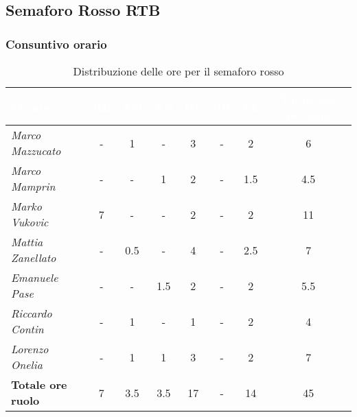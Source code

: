 \subsection{Semaforo Rosso RTB}
\subsubsection{Consuntivo orario}
\begin{table}[H]
    \renewcommand\arraystretch{1.5}
    \small
    \centering
        \begin{tabular}{|l|c|c|c|c|c|c|c|}
            \hline
            \rowcolor[HTML]{036400}
            \textcolor{white}{\textbf{Membro}} & \multicolumn{1}{c|}{\textcolor{white}{\textbf{RE}}} & \multicolumn{1}{c|}{\textcolor{white}{\textbf{AM}}} & \multicolumn{1}{c|}{\textcolor{white}{\textbf{AN}}} & \multicolumn{1}{c|}{\textcolor{white}{\textbf{PT}}} & \multicolumn{1}{c|}{\textcolor{white}{\textbf{PR}}} & \multicolumn{1}{c|}{\textcolor{white}{\textbf{VE}}} & \multicolumn{1}{c|}{\textcolor{white}{\textbf{Totale ore persona}}} \\ \hline
            \rowcolor[HTML]{EFEFEF}\textit{Marco Mazzucato}  & -        & 1          & -          & 3          & -        & 2        & 6       \\ \hline
            \rowcolor[HTML]{C0C0C0}\textit{Marco Mamprin}    & -        & -          & 1          & 2          & -        & 1.5      & 4.5       \\ \hline
            \rowcolor[HTML]{EFEFEF}\textit{Marko Vukovic}    & 7        & -          & -          & 2          & -        & 2        & 11       \\ \hline
            \rowcolor[HTML]{C0C0C0}\textit{Mattia Zanellato} & -        & 0.5        & -          & 4          & -        & 2.5      & 7       \\ \hline
            \rowcolor[HTML]{EFEFEF}\textit{Emanuele Pase}    & -        & -          & 1.5        & 2          & -        & 2        & 5.5       \\ \hline
            \rowcolor[HTML]{C0C0C0}\textit{Riccardo Contin}  & -        & 1          & -          & 1          & -        & 2        & 4       \\ \hline
            \rowcolor[HTML]{EFEFEF}\textit{Lorenzo Onelia}   & -        & 1          & 1          & 3          & -        & 2        & 7       \\ \hline
            \rowcolor[HTML]{C0C0C0}\textbf{Totale ore ruolo} & 7        & 3.5        & 3.5        & 17         & -        & 14       & 45       \\ \hline
        \end{tabular}
    \caption{Distribuzione delle ore per il semaforo rosso}
\end{table}

